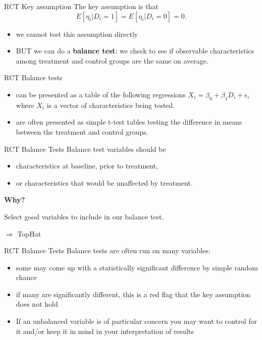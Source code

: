 \documentclass[
  ignorenonframetext,
]{beamer}
\begin{document}
\begin{frame}{RCT Key assumption}
\protect\hypertarget{rct-key-assumption}{}
The key assumption is that \[
E[\eta_i|D_i=1]= E[\eta_i|D_i=0]=0.
\]

\begin{itemize}
\item
  we cannot test this assumption directly
\item
  BUT we can do a \textbf{balance test}: we check to see if observable
  characteristics among treatment and control groups are the same on
  average.
\end{itemize}
\end{frame}

\begin{frame}{RCT Balance tests}
\protect\hypertarget{rct-balance-tests}{}
\begin{itemize}
\item
  can be presented as a table of the following regressions
  \(X_i=\beta_0+\beta_1D_i+\epsilon_i\) where \(X_i\) is a vector of
  characteristics being tested.
\item
  are often presented as simple t-test tables testing the difference in
  means between the treatment and control groups.
\end{itemize}
\end{frame}

\begin{frame}{RCT Balance Tests}
\protect\hypertarget{rct-balance-tests-1}{}
Balance test variables should be

\begin{itemize}
\item
  characteristics at baseline, prior to treatment,
\item
  or characteristics that would be unaffected by treatment.
\end{itemize}

\textbf{Why?}

Select good variables to include in our balance test.

\(\Rightarrow\) TopHat
\end{frame}

\begin{frame}{RCT Balance Tests}
\protect\hypertarget{rct-balance-tests-2}{}
Balance tests are often run on many variables:

\begin{itemize}
\item
  some may come up with a statistically significant difference by simple
  random chance
\item
  if many are significantly different, this is a red flag that the key
  assumption does not hold
\item
  If an unbalanced variable is of particular concern you may want to
  control for it and/or keep it in mind in your interpretation of
  results
\end{itemize}
\end{frame}
\end{document}
